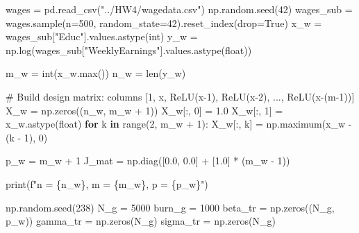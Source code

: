\documentclass[
  letterpaper,
  DIV=11,
  numbers=noendperiod]{scrartcl}
\newenvironment{Shaded}{\begin{snugshade}}{\end{snugshade}}
\newcommand{\BuiltInTok}[1]{\textcolor[rgb]{0.00,0.23,0.31}{#1}}
\newcommand{\CommentTok}[1]{\textcolor[rgb]{0.37,0.37,0.37}{#1}}
\newcommand{\ControlFlowTok}[1]{\textcolor[rgb]{0.00,0.23,0.31}{\textbf{#1}}}
\newcommand{\DecValTok}[1]{\textcolor[rgb]{0.68,0.00,0.00}{#1}}
\newcommand{\FloatTok}[1]{\textcolor[rgb]{0.68,0.00,0.00}{#1}}
\newcommand{\KeywordTok}[1]{\textcolor[rgb]{0.00,0.23,0.31}{\textbf{#1}}}
\newcommand{\NormalTok}[1]{\textcolor[rgb]{0.00,0.23,0.31}{#1}}
\newcommand{\OperatorTok}[1]{\textcolor[rgb]{0.37,0.37,0.37}{#1}}
\newcommand{\SpecialCharTok}[1]{\textcolor[rgb]{0.37,0.37,0.37}{#1}}
\newcommand{\SpecialStringTok}[1]{\textcolor[rgb]{0.13,0.47,0.30}{#1}}
\newcommand{\StringTok}[1]{\textcolor[rgb]{0.13,0.47,0.30}{#1}}
\newcommand{\VariableTok}[1]{\textcolor[rgb]{0.07,0.07,0.07}{#1}}
\begin{document}
\begin{Shaded}
\begin{Highlighting}[]
\NormalTok{wages }\OperatorTok{=}\NormalTok{ pd.read\_csv(}\StringTok{"../HW4/wagedata.csv"}\NormalTok{)}
\NormalTok{np.random.seed(}\DecValTok{42}\NormalTok{)}
\NormalTok{wages\_sub }\OperatorTok{=}\NormalTok{ wages.sample(n}\OperatorTok{=}\DecValTok{500}\NormalTok{, random\_state}\OperatorTok{=}\DecValTok{42}\NormalTok{).reset\_index(drop}\OperatorTok{=}\VariableTok{True}\NormalTok{)}
\NormalTok{x\_w }\OperatorTok{=}\NormalTok{ wages\_sub[}\StringTok{"Educ"}\NormalTok{].values.astype(}\BuiltInTok{int}\NormalTok{)}
\NormalTok{y\_w }\OperatorTok{=}\NormalTok{ np.log(wages\_sub[}\StringTok{"WeeklyEarnings"}\NormalTok{].values.astype(}\BuiltInTok{float}\NormalTok{))}

\NormalTok{m\_w }\OperatorTok{=} \BuiltInTok{int}\NormalTok{(x\_w.}\BuiltInTok{max}\NormalTok{())}
\NormalTok{n\_w }\OperatorTok{=} \BuiltInTok{len}\NormalTok{(y\_w)}

\CommentTok{\# Build design matrix: columns [1, x, ReLU(x{-}1), ReLU(x{-}2), ..., ReLU(x{-}(m{-}1))]}
\NormalTok{X\_w }\OperatorTok{=}\NormalTok{ np.zeros((n\_w, m\_w }\OperatorTok{+} \DecValTok{1}\NormalTok{))}
\NormalTok{X\_w[:, }\DecValTok{0}\NormalTok{] }\OperatorTok{=} \FloatTok{1.0}
\NormalTok{X\_w[:, }\DecValTok{1}\NormalTok{] }\OperatorTok{=}\NormalTok{ x\_w.astype(}\BuiltInTok{float}\NormalTok{)}
\ControlFlowTok{for}\NormalTok{ k }\KeywordTok{in} \BuiltInTok{range}\NormalTok{(}\DecValTok{2}\NormalTok{, m\_w }\OperatorTok{+} \DecValTok{1}\NormalTok{):}
\NormalTok{    X\_w[:, k] }\OperatorTok{=}\NormalTok{ np.maximum(x\_w }\OperatorTok{{-}}\NormalTok{ (k }\OperatorTok{{-}} \DecValTok{1}\NormalTok{), }\DecValTok{0}\NormalTok{)}

\NormalTok{p\_w }\OperatorTok{=}\NormalTok{ m\_w }\OperatorTok{+} \DecValTok{1}
\NormalTok{J\_mat }\OperatorTok{=}\NormalTok{ np.diag([}\FloatTok{0.0}\NormalTok{, }\FloatTok{0.0}\NormalTok{] }\OperatorTok{+}\NormalTok{ [}\FloatTok{1.0}\NormalTok{] }\OperatorTok{*}\NormalTok{ (m\_w }\OperatorTok{{-}} \DecValTok{1}\NormalTok{))}

\BuiltInTok{print}\NormalTok{(}\SpecialStringTok{f"n = }\SpecialCharTok{\{}\NormalTok{n\_w}\SpecialCharTok{\}}\SpecialStringTok{, m = }\SpecialCharTok{\{}\NormalTok{m\_w}\SpecialCharTok{\}}\SpecialStringTok{, p = }\SpecialCharTok{\{}\NormalTok{p\_w}\SpecialCharTok{\}}\SpecialStringTok{"}\NormalTok{)}

\NormalTok{np.random.seed(}\DecValTok{238}\NormalTok{)}
\NormalTok{N\_g }\OperatorTok{=} \DecValTok{5000}
\NormalTok{burn\_g }\OperatorTok{=} \DecValTok{1000}
\NormalTok{beta\_tr  }\OperatorTok{=}\NormalTok{ np.zeros((N\_g, p\_w))}
\NormalTok{gamma\_tr }\OperatorTok{=}\NormalTok{ np.zeros(N\_g)}
\NormalTok{sigma\_tr }\OperatorTok{=}\NormalTok{ np.zeros(N\_g)}


\end{Highlighting}
\end{Shaded}
\end{document}
